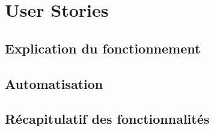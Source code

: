 \section{User Stories}
\subsection{Explication du fonctionnement }
\subsection{Automatisation }
\subsection{Récapitulatif des fonctionnalités }